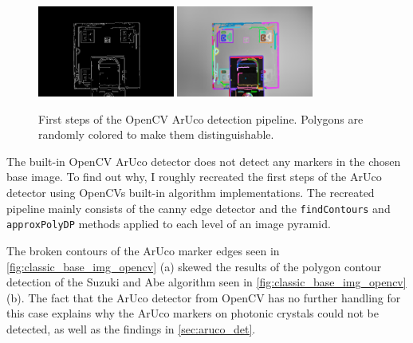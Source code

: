 \documentclass[10pt]{book}
\newcommand{\figurereft}[2]{\autoref{#1} #2}
\begin{document}
\begin{figure}
  \centering
     {\includegraphics[width=0.4\textwidth]{image/classic_base_img_opencv_det_edges}}
     {\includegraphics[width=0.4\textwidth]{image/classic_base_img_opencv_det_contours}}
  \caption{First steps of the \ac{OpenCV} \ac{ArUco} detection pipeline. Polygons are randomly colored to make them distinguishable.}
  \label{fig:classic_base_img_opencv}
\end{figure}

The built-in \ac{OpenCV} \ac{ArUco} detector does not detect any markers in the chosen base image. To find out why, I roughly recreated the first steps of the \ac{ArUco} detector using \acp{OpenCV} built-in algorithm implementations. The recreated pipeline mainly consists of the canny edge detector and the \texttt{findContours} and \texttt{approxPolyDP} methods applied to each level of an image pyramid. 

The broken contours of the \ac{ArUco} marker edges seen in \figurereft{fig:classic_base_img_opencv}{(a)} skewed the results of the polygon contour detection of the Suzuki and Abe algorithm seen in \figurereft{fig:classic_base_img_opencv}{(b)}. The fact that the \ac{ArUco} detector from \ac{OpenCV} has no further handling for this case explains why the \ac{ArUco} markers on photonic crystals could not be detected, as well as the findings in \autoref{sec:aruco_det}.

\end{document}
